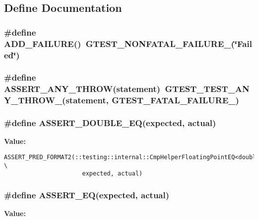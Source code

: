\subsection{Define Documentation}
\subsubsection{\setlength{\rightskip}{0pt plus 5cm}\#define ADD\_\-FAILURE()~GTEST\_\-NONFATAL\_\-FAILURE\_\-(\char`\"{}Failed\char`\"{})}\label{gtest_8h_056e7339ae81e48538fae49e20995c60}


\subsubsection{\setlength{\rightskip}{0pt plus 5cm}\#define ASSERT\_\-ANY\_\-THROW(statement)~GTEST\_\-TEST\_\-ANY\_\-THROW\_\-(statement, GTEST\_\-FATAL\_\-FAILURE\_\-)}\label{gtest_8h_150089479ffce17438115a50442c56ca}


\subsubsection{\setlength{\rightskip}{0pt plus 5cm}\#define ASSERT\_\-DOUBLE\_\-EQ(expected, actual)}\label{gtest_8h_83dda6fa372bc1f88db2f29a00de147a}


\textbf{Value:}

\begin{Code}\begin{verbatim}ASSERT_PRED_FORMAT2(::testing::internal::CmpHelperFloatingPointEQ<double>, \
                      expected, actual)
\end{verbatim}
\end{Code}
\subsubsection{\setlength{\rightskip}{0pt plus 5cm}\#define ASSERT\_\-EQ(expected, actual)}\label{gtest_8h_f2f962e2200ec490248e50436826cc60}


\textbf{Value:}

